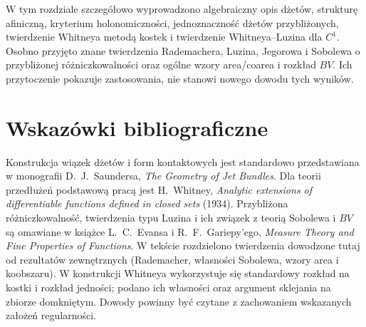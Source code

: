\begin{uwaga}
W tym rozdziale szczegółowo wyprowadzono algebraiczny opis
dżetów, strukturę afiniczną, kryterium holonomiczności,
jednoznaczność dżetów przybliżonych, twierdzenie Whitneya
metodą kostek i twierdzenie Whitneya--Luzina dla $C^1$.
Osobno przyjęto znane twierdzenia Rademachera, Luzina,
Jegorowa i Sobolewa o przybliżonej różniczkowalności
oraz ogólne wzory area/coarea i rozkład $BV$.
Ich przytoczenie pokazuje zastosowania, nie stanowi
nowego dowodu tych wyników.
\end{uwaga}


\section*{Wskazówki bibliograficzne}
Konstrukcja wiązek dżetów i form kontaktowych jest standardowo
przedstawiana w monografii D.~J.~Saundersa,
\emph{The Geometry of Jet Bundles}. Dla teorii przedłużeń
podstawową pracą jest H.~Whitney,
\emph{Analytic extensions of differentiable functions defined
in closed sets} (1934). Przybliżona różniczkowalność,
twierdzenia typu Luzina i ich związek z teorią Sobolewa i $BV$
są omawiane w książce L.~C.~Evansa i R.~F.~Gariepy'ego,
\emph{Measure Theory and Fine Properties of Functions}.
W tekście rozdzielono twierdzenia dowodzone tutaj od
rezultatów zewnętrznych (Rademacher, własności Sobolewa,
wzory area i koobszaru). W konstrukcji Whitneya wykorzystuje
się standardowy rozkład na kostki i rozkład jedności;
podano ich własności oraz argument sklejania na zbiorze
domkniętym. Dowody powinny być czytane z zachowaniem
wskazanych założeń regularności.